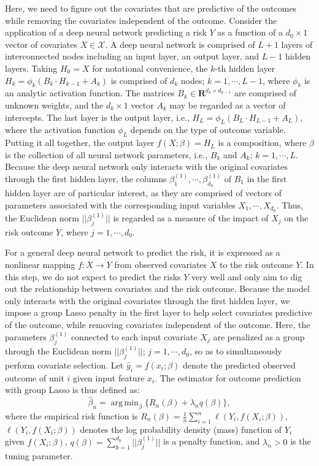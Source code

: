 \documentclass[letterpaper]{article} %
\newcommand{\mb}{\mathbf}
\newcommand{\mc}{\mathcal}
\DeclareMathOperator*{\argmin}{arg\,min}
\theoremstyle{definition}
\theoremstyle{remark}
\begin{document}
Here, we need to figure out the covariates that are predictive of the outcomes while removing the covariates independent of the outcome. Consider the application of a deep neural network predicting a risk $Y$ as a function of a $d_0\times1$ vector of covariates $X \in \mc{X}$. A deep neural network is comprised of $L+1$ layers of interconnected nodes including an input layer, an output layer, and $L-1$ hidden layers. Taking $H_0=X$ for notational convenience, the $k$-th hidden layer $H_{k}=\phi_k(B_k \cdot H_{k-1} + A_k)$ is comprised of $d_k$ nodes; $k=1,\cdots,L-1$, where $\phi_k$ is an analytic activation function. The matrices $B_k \in \mb{R}^{d_{k}\times d_{k-1} }$ are comprised of unknown weights, and the $d_k \times 1$ vector $A_k$ may be regarded as a vector of intercepts. The last layer is the output layer, i.e., $H_L=\phi_L(B_L \cdot H_{L-1} + A_L)$, where the activation function $\phi_L$ depends on the type of outcome variable. Putting it all together, the output layer $f(X;\beta)=H_L$ is a composition, where $\beta$ is the collection of all neural network parameters, i.e., $B_k$ and $A_k$; $k=1,\cdots, L$. Because the deep neural network only interacts with the original covariates through the first hidden layer, the columns $\beta_1^{(1)}, \cdots,\beta_{d_0}^{(1)}$ of $B_1$  in the first hidden layer are of particular interest, as they are comprised of vectors of parameters associated with the corresponding input variables $X_1,\cdots,X_{d_0}$. Thus, the Euclidean norm $||\beta_j^{(1)} ||$ is regarded as a measure of the impact of $X_j$ on the risk outcome $Y$, where $j=1, \cdots , d_0$.

For a general deep neural network to predict the risk, it is expressed as a nonlinear mapping $f: X \rightarrow Y$ from observed covariates $X$ to the risk outcome $Y$. In this step, we do not expect to predict the risks $Y$ very well and only aim to dig out the relationship between covariates and the risk outcome. Because the model only interacts with the original covariates through the first hidden layer, we impose a group Lasso penalty in the first layer to help select covariates predictive of the outcome, while removing covariates independent of the outcome. Here, the parameters $\beta_j^{(1)}$ connected to each input covariate $X_j$ are penalized as a group through the Euclidean norm $||\beta_j^{(1)}||$; $j=1,\cdots,d_0$, so as to simultaneously perform covariate selection. Let $\hat{y}_i=f(x_i;\beta)$ denote the predicted observed outcome of unit $i$ given input feature $x_i$. The estimator for outcome prediction with group Lasso is thus defined as:
\begin{equation}
    \widehat{\beta}_n = \argmin_{\beta} \{ R_n(\beta)+\lambda_n q(\beta)\},
    \label{Eqn: outcome}
\end{equation}
where the empirical risk function is $R_n(\beta)=\frac{1}{n}\sum_{i=1}^{n}\ell(Y_i,f(X_i;\beta))$, $\ell(Y_i,f(X_i;\beta))$ denotes the log probability density (mass) function of $Y_i$ given $f(X_i;\beta)$, $q(\beta)=\sum_{k=1}^{d_0}||\beta_j^{(1)}||$ is a penalty function, and $\lambda_n > 0$ is the tuning parameter.
\end{document}
